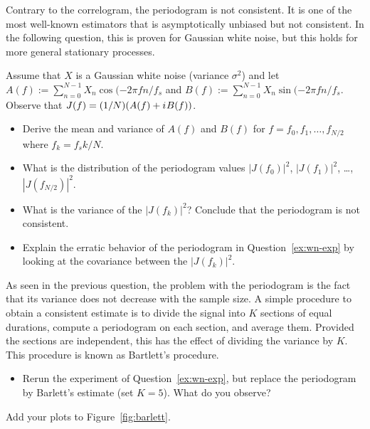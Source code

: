 \documentclass[11pt]{article}
\begin{document}
Contrary to the correlogram, the periodogram is not consistent.
It is one of the most well-known estimators that is asymptotically unbiased but not consistent.
In the following question, this is proven for Gaussian white noise, but this holds for more general stationary processes.
\begin{exercise}
    Assume that $X$ is a Gaussian white noise (variance $\sigma^2$) and let $A(f):=\sum_{n=0}^{N-1} X_n \cos(-2\pi f n/f_s$ and $B(f):=\sum_{n=0}^{N-1} X_n \sin(-2\pi f n/f_s$.
    Observe that $J(f) = (1/N) (A(f) + {i\mkern1mu} B(f))$.
    \begin{itemize}
        \item Derive the mean and variance of $A(f)$ and $B(f)$ for $f=f_0, f_1,\dots, f_{N/2}$ where $f_k=f_s k/N$.
        \item What is the distribution of the periodogram values $|J(f_0)|^2$, $|J(f_1)|^2$, \dots, $|J(f_{N/2})|^2$.
        \item What is the variance of the $|J(f_k)|^2$? Conclude that the periodogram is not consistent.
        \item Explain the erratic behavior of the periodogram in Question~\ref{ex:wn-exp} by looking at the covariance between the $|J(f_k)|^2$.
    \end{itemize}
    
\end{exercise}

\begin{solution}
    
\end{solution}

\begin{exercise}\label{q:barlett}
    As seen in the previous question, the problem with the periodogram is the fact that its variance does not decrease with the sample size.
    A simple procedure to obtain a consistent estimate is to divide the signal into $K$ sections of equal durations, compute a periodogram on each section, and average them.
    Provided the sections are independent, this has the effect of dividing the variance by $K$. 
    This procedure is known as Bartlett's procedure.
    \begin{itemize}
        \item Rerun the experiment of Question~\ref{ex:wn-exp}, but replace the periodogram by Barlett's estimate (set $K=5$). What do you observe?
    \end{itemize}
    Add your plots to Figure~\ref{fig:barlett}.
\end{exercise}
\end{document}
